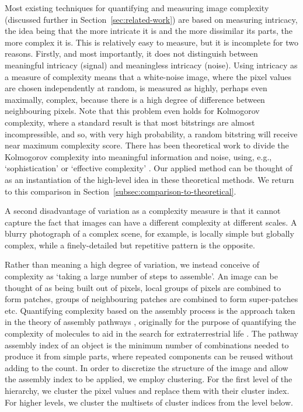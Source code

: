 \documentclass[a4paper,fleqn]{cas-sc}
\theoremstyle{remark}
\begin{document}
Most existing techniques for quantifying and measuring image complexity (discussed further in Section~\ref{sec:related-work}) are based on measuring intricacy, the idea being that the more intricate it is and the more dissimilar its parts, the more complex it is. 
This is relatively easy to measure, but it is incomplete for two reasons. Firstly, and most importantly, it does not distinguish between meaningful intricacy (signal) and meaningless intricacy (noise). Using intricacy as a measure of complexity means that a white-noise image, where the pixel values are chosen independently at random, is measured as highly, perhaps even maximally, complex, because there is a high degree of difference between neighbouring pixels. Note that this problem even holds for Kolmogorov complexity, where a standard result is that most bitstrings are almost incompressible, and so, with very high probability, a random bitstring will receive near maximum complexity score. There has been theoretical work to divide the Kolmogorov complexity into meaningful information and noise, using, e.g., `sophistication' \citep{koppel1987complexity,vitanyi2006meaningful} or `effective complexity' \cite{ay2010effective,gell1996information}. Our applied method can be thought of as an instantiation of the high-level idea in these theoretical methods. We return to this comparison in Section~\ref{subsec:comparison-to-theoretical}.

A second disadvantage of variation as a complexity measure is that it cannot capture the fact that images can have a different complexity at different scales. A blurry photograph of a complex scene, for example, is locally simple but globally complex, while a finely-detailed but repetitive pattern is the opposite.

Rather than meaning a high degree of variation, we instead conceive of complexity as `taking a large number of steps to assemble'. An image can be thought of as being built out of pixels, local groups of pixels are combined to form patches, groups of neighbouring patches are combined to form super-patches etc. Quantifying complexity based on the assembly process is the approach taken in the theory of assembly pathways \citep{cronin2006imitation,marshall2019quantifying}, originally for the purpose of quantifying the complexity of molecules to aid in the search for extraterrestrial life \citep{marshall2021identifying,schwieterman2018exoplanet}. The pathway assembly index of an object is the minimum number of combinations needed to produce it from simple parts, where repeated components can be reused without adding to the count. In order to discretize the structure of the image and allow the assembly index to be applied, we employ clustering. For the first level of the hierarchy, we cluster the pixel values and replace them with their cluster index. For higher levels, we cluster the multisets of cluster indices from the level below. 
\end{document}

